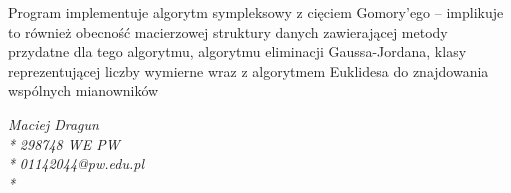 \documentclass[]{article}
\begin{document}
    Program implementuje algorytm sympleksowy z cięciem Gomory'ego --
    implikuje to również obecność macierzowej struktury danych zawierającej
    metody przydatne dla tego algorytmu, algorytmu eliminacji Gaussa-Jordana, klasy
    reprezentującej liczby wymierne wraz z algorytmem Euklidesa do
    znajdowania wspólnych mianowników

    \begin{flushright}
        \emph{Maciej Dragun\\*}
        \emph{298748 WE PW\\*}
        \emph{01142044@pw.edu.pl\\*}
    \end{flushright}
\end{document}
